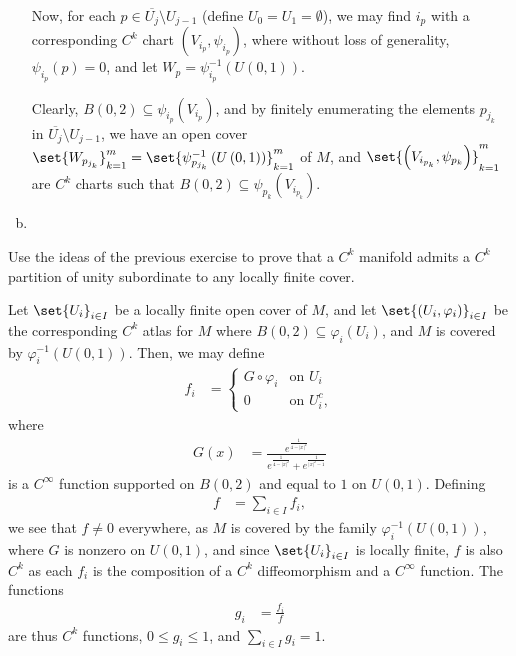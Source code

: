 \documentclass[10pt]{mypackage}
\begin{document}
\begin{solution}
\begin{enumerate}[(a)]
      Now, for each $p\in \overline{U_{j}}\setminus U_{j-1}$ (define $U_{0} = U_{1} = \emptyset$), we may find $i_p$ with a corresponding $C^{k}$ chart $\left( V_{i_p},\psi_{i_p} \right)$, where without loss of generality, $\psi_{i_p}\left( p \right) = 0$, and let $W_p = \psi_{i_p}^{-1}\left( U\left( 0,1 \right) \right)$.\newline

      Clearly, $B\left( 0,2 \right)\subseteq \psi_{i_p}\left( V_{i_p} \right)$, and by finitely enumerating the elements $p_{j_k}$ in $ \overline{U_{j}}\setminus U_{j-1} $, we have an open cover $\set{W_{p_{j_k}}}_{k=1}^{m} = \set{\psi_{p_{j_k}}^{-1}\left( U\left( 0,1 \right) \right)}_{k=1}^{m}$ of $M$, and $\set{\left( V_{i_{p_k}},\psi_{p_k} \right)}_{k=1}^{m}$ are $ C^{k}$ charts such that $B\left( 0,2 \right)\subseteq \psi_{p_k}\left( V_{i_{p_k}} \right)$.
    \item 
  \end{enumerate}
\end{solution}
\begin{problem}[Problem 6]
  Use the ideas of the previous exercise to prove that a $C^{k}$ manifold admits a $C^{k}$ partition of unity subordinate to any locally finite cover.
\end{problem}
\begin{solution}
  Let $\set{U_i}_{i\in I}$ be a locally finite open cover of $M$, and let $\set{\left( U_i,\varphi_i \right)}_{i\in I}$ be the corresponding $C^{k}$ atlas for $M$ where $B\left( 0,2 \right)\subseteq \varphi_{i} \left( U_i \right)$, and $M$ is covered by $\varphi_{i}^{-1}\left( U\left( 0,1 \right) \right)$. Then, we may define
  \begin{align*}
    f_i &= \begin{cases}
      G\circ \varphi_i & \text{on $U_i$}\\
      0 & \text{on $U_i^{c}$},
    \end{cases}
  \end{align*}
  where
  \begin{align*}
    G(x) &= \frac{e^{\frac{1}{4-\left\vert x \right\vert^2}}}{e^{\frac{1}{4-\left\vert x \right\vert^2}} + e^{ \frac{1}{\left\vert x \right\vert^2 - 1} }}
  \end{align*}
  is a $C^{\infty}$ function supported on $B\left( 0,2 \right)$ and equal to $1$ on $U\left( 0,1 \right)$. Defining
  \begin{align*}
    f &= \sum_{i\in I} f_i,
  \end{align*}
  we see that $f\neq 0$ everywhere, as $M$ is covered by the family $\varphi_{i}^{-1}\left( U\left( 0,1 \right) \right)$, where $G$ is nonzero on $U\left( 0,1 \right)$, and since $\set{U_i}_{i\in I}$ is locally finite, $f$ is also $C^{k}$ as each $f_i$ is the composition of a $C^{k}$ diffeomorphism and a $C^{\infty}$ function. The functions
  \begin{align*}
    g_i &= \frac{f_i}{f}
  \end{align*}
  are thus $C^{k}$ functions, $0\leq g_i \leq 1$, and $\sum_{i\in I} g_i = 1$.
\end{solution}
\end{document}
